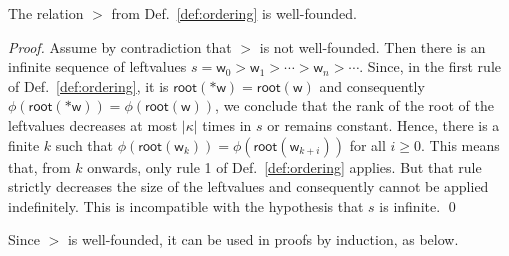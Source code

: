\begin{proposition}\label{prop:well-founded}
  The relation $>$ from Def.~\ref{def:ordering} is well-founded.
\end{proposition}
\begin{proof}
  Assume by contradiction that $>$ is not well-founded. Then there is an infinite sequence of
  leftvalues $s=\mathsf{w}_0>\mathsf{w}_1>\cdots>\mathsf{w}_n>\cdots$.
  Since, in the first rule of Def.~\ref{def:ordering}, it is
  $\mathsf{root}(\mathtt{*}\mathsf{w})=\mathsf{root}(\mathsf{w})$ and consequently
  $\phi(\mathsf{root}(\mathtt{*}\mathsf{w}))=\phi(\mathsf{root}(\mathsf{w}))$,
  we conclude that the rank of the root of the leftvalues
  decreases at most
  $|\kappa|$ times in $s$ or remains constant. Hence, there is a finite $k$ such that
  $\phi(\mathsf{root}(\mathsf{w}_{k}))=\phi(\mathsf{root}(\mathsf{w}_{k+i}))$
  for all $i\ge 0$. This means that, from $k$ onwards, only rule 1 of Def.~\ref{def:ordering}
  applies. But that rule strictly decreases the size of the leftvalues and consequently cannot
  be applied indefinitely. This is incompatible with the hypothesis that $s$ is infinite.
  \qed
\end{proof}

Since $>$ is well-founded, it can be used in proofs by induction, as below.

